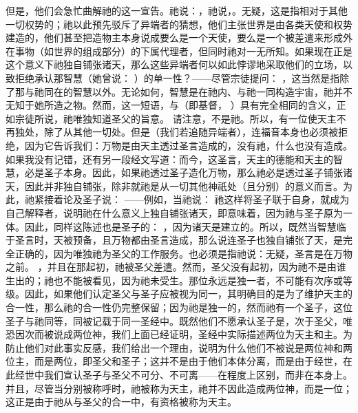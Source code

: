 但是，他们会急忙曲解祂的这一宣告。祂说：，祂说，。无疑，这是指相对于其他一切权势的；祂以此预先驳斥了异端者的猜想，他们主张世界是由各类天使和权势建造的，他们甚至把造物主本身说成要么是一个天使，要么是一个被差遣来形成外在事物（如世界的组成部分）的下属代理者，但同时祂对一无所知。如果现在正是这个意义下祂独自铺张诸天，那么这些异端者何以如此悖谬地采取他们的立场，以致拒绝承认那智慧（她曾说： ）的单一性？——尽管宗徒提问： ，这当然是指除了那与祂同在的智慧以外。无论如何，智慧是在祂内、与祂一同构造宇宙，祂并不无知于她所造之物。然而，这一短语，与（即基督， ）具有完全相同的含义，正如宗徒所说，祂唯独知道圣父的旨意。 请注意，不是祂。所以，有一位使天主不再独处，除了从其他一切处。但是（我们若追随异端者），连福音本身也必须被拒绝，因为它告诉我们：万物是由天主透过圣言造成的，没有祂，什么也没有造成。如果我没有记错，还有另一段经文写道：而今，这圣言，天主的德能和天主的智慧，必是圣子本身。因此，如果祂透过圣子造化万物，那么祂必是透过圣子铺张诸天，因此并非独自铺张，除非就祂是从一切其他神祇处（且分别）的意义而言。为此，祂紧接着论及圣子说： ——例如，当祂说： 祂这样将圣子联于自身，就成为自己解释者，说明祂在什么意义上独自铺张诸天，即意味着，因为祂与圣子原为一体。因此，同样这陈述也是圣子的： ，因为诸天是建立的。所以，既然当智慧临于圣言时，天被预备，且万物都由圣言造成，那么说连圣子也独自铺张了天，是完全正确的，因为唯独祂为圣父的工作服务。也必须是指祂说：无疑，圣言是在万物之前。 ，并且在那起初，祂被圣父差遣。然而，圣父没有起初，因为祂不是由谁生出的；祂也不能被看见，因为祂未受生。那位永远是独一者，不可能有次序或等级。因此，如果他们认定圣父与圣子应被视为同一，其明确目的是为了维护天主的合一性，那么祂的合一性仍完整保留；因为祂是独一的，然而祂有一个圣子，这位圣子与祂同等，同被记载于同一圣经中。既然他们不愿承认圣子是，次于圣父，唯恐因次而被说成两位神，我们上面已经证明，圣经中实际描述两位为天主和主。为防止他们对此事实反感，我们给出一个理由，说明为什么他们不被说是两位神和两位主，而是两位，即圣父和圣子；这并不是由于他们本体分离，而是由于经世，在此经世中我们宣认圣子与圣父不可分、不可离——在程度上区别，而非在本身上。并且，尽管当分别被称呼时，祂被称为天主，祂并不因此造成两位神，而是一位；这正是由于祂从与圣父的合一中，有资格被称为天主。\par

